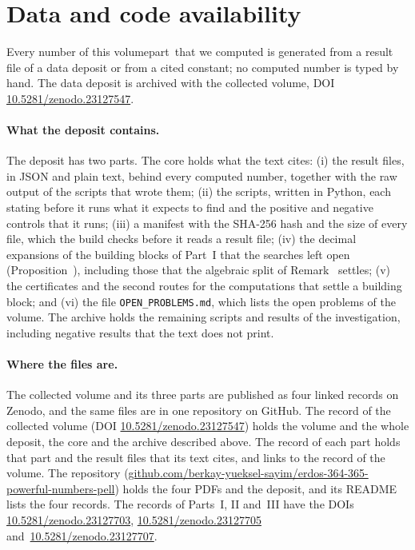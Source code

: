 %
%
%
%
%
\section*{Data and code availability}

Every number of this \ifimband volume\else part\fi\ that we computed is generated from a result file of a data deposit or from a cited constant; no computed number is
typed by hand. The data deposit is archived with the collected volume, DOI \href{https://doi.org/10.5281/zenodo.23127547}{10.5281/zenodo.23127547}.

\paragraph{What the deposit contains.} The deposit has two parts. The core holds what the text cites: (i) the result files, in JSON and
plain text, behind every computed number, together with the raw output of the scripts that wrote them; (ii) the scripts, written in Python,
each stating before it runs what it expects to find and the positive and negative controls that it runs; (iii) a manifest with the SHA-256 hash
and the size of every file, which the build checks before it reads a result file; (iv) the decimal expansions of the building blocks of
Part~I that the searches left open (Proposition~), including those that the algebraic split of
Remark~ settles; (v) the certificates and the second routes for the computations that settle a building block; and
(vi) the file \texttt{OPEN\_PROBLEMS.md}, which lists the open problems of the volume. The archive holds the remaining scripts and results of the
investigation, including negative results that the text does not print.

\paragraph{Where the files are.} The collected volume and its three parts are published as four linked records on Zenodo, and the same files
are in one repository on GitHub. The record of the collected volume (DOI \href{https://doi.org/10.5281/zenodo.23127547}{10.5281/zenodo.23127547}) holds the volume and the whole deposit,
the core and the archive described above. The record of each part holds that part and the result files that its text cites, and links to the
record of the volume. The repository (\href{https://github.com/berkay-yueksel-sayim/erdos-364-365-powerful-numbers-pell}{github.com/berkay-yueksel-sayim/erdos-364-365-powerful-numbers-pell}) holds the four PDFs and the deposit, and its README lists the four records. The records of Parts~I, II and~III have the DOIs \href{https://doi.org/10.5281/zenodo.23127703}{10.5281/zenodo.23127703}, \href{https://doi.org/10.5281/zenodo.23127705}{10.5281/zenodo.23127705} and~\href{https://doi.org/10.5281/zenodo.23127707}{10.5281/zenodo.23127707}.

